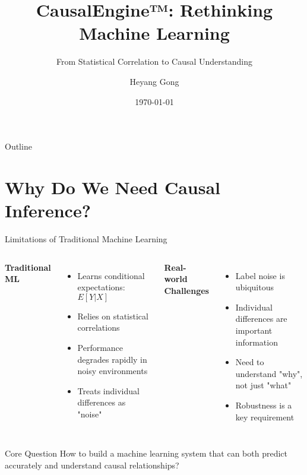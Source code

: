 \documentclass[aspectratio=169,10pt]{beamer}
\title{CausalEngine™: Rethinking Machine Learning}
\subtitle{From Statistical Correlation to Causal Understanding}
\author{Heyang Gong}
\date{\today}
\begin{document}
\begin{frame}
\titlepage
\end{frame}

\begin{frame}{Outline}
\tableofcontents
\end{frame}

\section{Why Do We Need Causal Inference?}

\begin{frame}{Limitations of Traditional Machine Learning}
\begin{columns}
\textbf{Traditional ML}
\begin{itemize}
    \item Learns conditional expectations: $E[Y|X]$
    \item Relies on statistical correlations
    \item Performance degrades rapidly in noisy environments
    \item Treats individual differences as "noise"
\end{itemize}

\textbf{Real-world Challenges}
\begin{itemize}
    \item Label noise is ubiquitous
    \item Individual differences are important information
    \item Need to understand "why", not just "what"
    \item Robustness is a key requirement
\end{itemize}
\end{columns}

\vspace{1em}
\begin{alertblock}{Core Question}
How to build a machine learning system that can both predict accurately and understand causal relationships?
\end{alertblock}
\end{frame}
\end{document}
